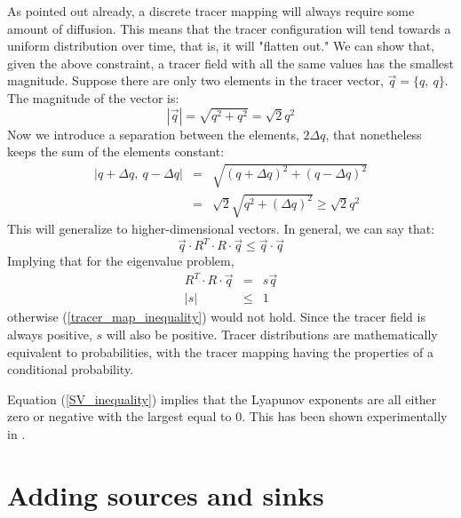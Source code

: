\documentclass[12pt]{article}
\begin{document}
As pointed out already, a discrete tracer mapping will always require some 
amount of diffusion.  This means that the tracer configuration will 
tend towards a uniform distribution over time, 
that is, it will "flatten out."  We can
show that, given the above constraint, a tracer field with all the same values
 has the smallest magnitude.  Suppose there are only two elements in the 
tracer vector, $\vec q=\lbrace q,~q \rbrace$.  The magnitude of the vector is:
\begin{equation}
|\vec q|=\sqrt{q^2+q^2}=\sqrt{2} q^2
\end{equation}
Now we introduce a separation between the elements, $2\Delta q$, that 
nonetheless keeps the sum of the elements constant:
\begin{eqnarray}
|q+\Delta q,~q-\Delta q| & = & \sqrt{(q+\Delta q)^2+(q-\Delta q)^2} \\
& = & \sqrt{2}\sqrt{q^2+(\Delta q)^2} \ge \sqrt{2} q^2
\end{eqnarray}
This will generalize to higher-dimensional vectors.  In general, we can
say that:
\begin{equation}
\vec q \cdot R^T \cdot R \cdot \vec q \le \vec q \cdot \vec q
\label{tracer_map_inequality}
\end{equation}
Implying that for the eigenvalue problem,
\begin{eqnarray}
R^T \cdot R \cdot \vec q & = & s \vec q \nonumber\\
|s| & \le & 1 \label{SV_inequality}
\end{eqnarray}
otherwise (\ref{tracer_map_inequality}) would not hold.
Since the tracer field is always positive, $s$ will also be positive.
Tracer distributions are mathematically equivalent to probabilities, 
with the tracer
mapping having the properties of a conditional probability.

Equation (\ref{SV_inequality}) implies that the Lyapunov exponents are all
either zero or negative with the largest equal to 0.  This has been shown
experimentally in \citet{Mills2012}.

\section{Adding sources and sinks}
\end{document}
